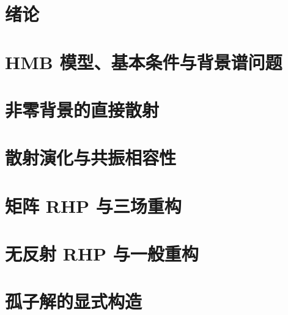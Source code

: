 \documentclass[type=master,oneside]{fduthesis}
\begin{document}

\frontmatter

\begingroup
\linespread{1.05}\selectfont
\tableofcontents
\endgroup



\listoffigures

\mainmatter
\chapter{绪论}\label{ch:intro}


\chapter{HMB 模型、基本条件与背景谱问题}\label{ch:model}


\chapter{非零背景的直接散射}\label{ch:direct}


\chapter{散射演化与共振相容性}\label{ch:scattering}


\chapter{矩阵 RHP 与三场重构}\label{ch:rhp}


\chapter{无反射 RHP 与一般重构}\label{ch:soliton}


\chapter{孤子解的显式构造}\label{ch:verification}


\FloatBarrier

\backmatter
\end{document}
